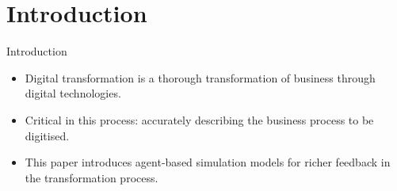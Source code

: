 \section{Introduction}

\begin{frame}{Introduction}
    \begin{itemize}
        \item \alert{Digital transformation} is a thorough transformation of business through digital technologies.
        \item Critical in this process: accurately describing the business process to be digitised.
        \item This paper introduces agent-based simulation models for richer feedback in the transformation process.
    \end{itemize}
\end{frame}
